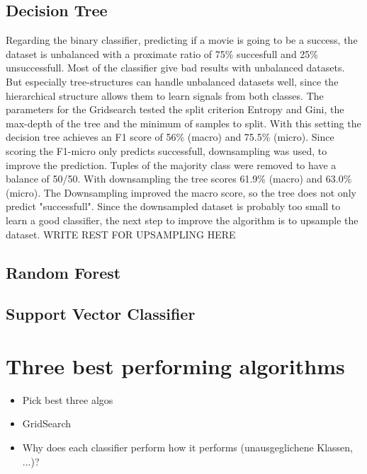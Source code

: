 \subsection{Decision Tree}
Regarding the binary classifier, predicting if a movie is going to be a success, the dataset is unbalanced with a proximate ratio of 75\% succesfull and 25\% unsuccessfull. Most of the classifier give bad results with unbalanced datasets. But especially tree-structures can handle unbalanced datasets well, since the hierarchical structure allows them to learn signals from both classes.
The parameters for the Gridsearch tested the split criterion Entropy and Gini, the max-depth of the tree and the minimum of samples to split. 
With this setting the decision tree achieves an F1 score of 56\% (macro) and 75.5\% (micro).
Since scoring the F1-micro only predicts successfull, downsampling was used, to improve the prediction. Tuples of the majority class were removed to have a balance of 50/50.
With downsampling the tree scores 61.9\% (macro) and 63.0\% (micro). The Downsampling improved the macro score, so the tree does not only predict "successfull". Since the downsampled dataset is probably too small to learn a good classifier, the next step to improve the algorithm is to upsample the dataset. WRITE REST FOR UPSAMPLING HERE

\subsection{Random Forest}

\subsection{Support Vector Classifier}

\section{Three best performing algorithms}
\begin{itemize}
	\item Pick best three algos
	\item GridSearch
	\item Why does each classifier perform how it performs (unausgeglichene Klassen, ...)?
\end{itemize}
